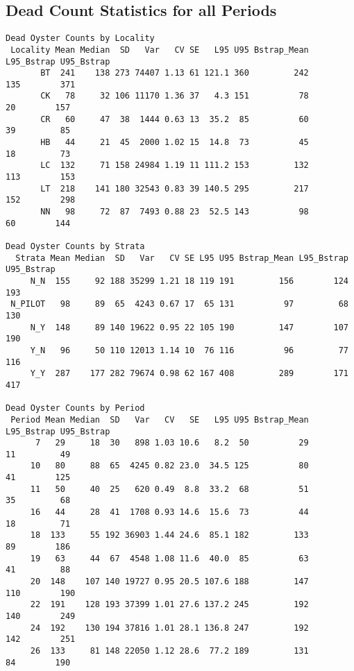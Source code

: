 \documentclass[
]{article}
\begin{document}
\newpage

\hypertarget{dead-count-statistics-for-all-periods}{%
\subsection{Dead Count Statistics for all
Periods}\label{dead-count-statistics-for-all-periods}}

\begin{verbatim}
Dead Oyster Counts by Locality
 Locality Mean Median  SD   Var   CV SE   L95 U95 Bstrap_Mean L95_Bstrap U95_Bstrap
       BT  241    138 273 74407 1.13 61 121.1 360         242        135        371
       CK   78     32 106 11170 1.36 37   4.3 151          78         20        157
       CR   60     47  38  1444 0.63 13  35.2  85          60         39         85
       HB   44     21  45  2000 1.02 15  14.8  73          45         18         73
       LC  132     71 158 24984 1.19 11 111.2 153         132        113        153
       LT  218    141 180 32543 0.83 39 140.5 295         217        152        298
       NN   98     72  87  7493 0.88 23  52.5 143          98         60        144

Dead Oyster Counts by Strata
  Strata Mean Median  SD   Var   CV SE L95 U95 Bstrap_Mean L95_Bstrap U95_Bstrap
     N_N  155     92 188 35299 1.21 18 119 191         156        124        193
 N_PILOT   98     89  65  4243 0.67 17  65 131          97         68        130
     N_Y  148     89 140 19622 0.95 22 105 190         147        107        190
     Y_N   96     50 110 12013 1.14 10  76 116          96         77        116
     Y_Y  287    177 282 79674 0.98 62 167 408         289        171        417

Dead Oyster Counts by Period
 Period Mean Median  SD   Var   CV   SE   L95 U95 Bstrap_Mean L95_Bstrap U95_Bstrap
      7   29     18  30   898 1.03 10.6   8.2  50          29         11         49
     10   80     88  65  4245 0.82 23.0  34.5 125          80         41        125
     11   50     40  25   620 0.49  8.8  33.2  68          51         35         68
     16   44     28  41  1708 0.93 14.6  15.6  73          44         18         71
     18  133     55 192 36903 1.44 24.6  85.1 182         133         89        186
     19   63     44  67  4548 1.08 11.6  40.0  85          63         41         88
     20  148    107 140 19727 0.95 20.5 107.6 188         147        110        190
     22  191    128 193 37399 1.01 27.6 137.2 245         192        140        249
     24  192    130 194 37816 1.01 28.1 136.8 247         192        142        251
     26  133     81 148 22050 1.12 28.6  77.2 189         131         84        190
\end{verbatim}
\end{document}
